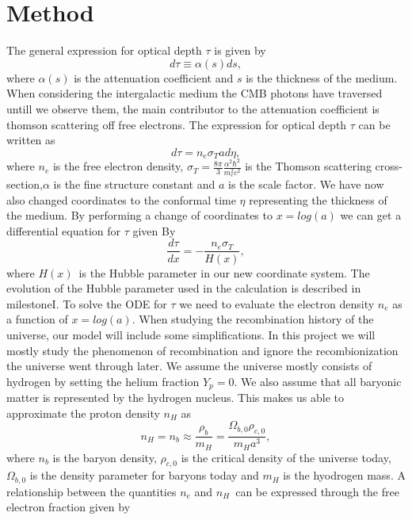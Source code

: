 \documentclass[onecolumn]{aastex62}
\begin{document}
\section{Method} \label{sec:method}
The general expression for optical depth $\tau$ is given by
\begin{equation}
    d\tau\equiv\alpha(s)ds,
\end{equation}
where $\alpha(s)$ is the attenuation coefficient and $s$ is the thickness of the medium. When considering the intergalactic medium the CMB photons have traversed untill we observe them, the main contributor to the attenuation coefficient is thomson scattering off free electrons. The expression for optical depth $\tau$ can be written as
\begin{equation}
    d\tau=n_e\sigma_T ad\eta,
\end{equation}
where $n_e$ is the free electron density, $\sigma_T = \frac{8\pi}{3}\frac{\alpha^2\hbar^2}{m_e^2c^2}$ is the Thomson scattering cross-section,$\alpha$ is the fine structure constant and $a$ is the scale factor. We have now also changed coordinates to the conformal time $\eta$ representing the thickness of the medium. By performing a change of coordinates to $x=log(a)$ we can get a differential equation for $\tau$ given By
\begin{equation}\label{eq:optical_depth_of_x}
    \frac{d\tau}{dx} = -\frac{n_e \sigma_T }{H(x)},
\end{equation}
where $H(x)$ is the Hubble parameter in our new coordinate system. The evolution of the Hubble parameter used in the calculation is described in milestoneI. To solve the ODE for $\tau$ we need to evaluate the electron density $n_e$ as a function of $x=log(a)$. When studying the recombination history of the universe, our model will include some simplifications. In this project we will mostly study the phenomenon of recombination and ignore the recombionization the universe went through later. We assume the universe mostly consists of hydrogen by setting the helium fraction $Y_p=0$. We also assume that all baryonic matter is represented by the hydrogen nucleus. This makes us able to approximate the proton density $n_H$ as
\begin{equation}\label{eq:baryondensity}
    n_H = n_b \approx \frac{\rho_b}{m_H} = \frac{\Omega_{b,0} \rho_{c,0}}{m_H a^3},
\end{equation}
where $n_b$ is the baryon density, $\rho_{c,0}$ is the critical density of the universe today, $\Omega_{b,0}$ is the density parameter for baryons today and $m_H$ is the hyodrogen mass. A relationship between the quantities $n_e$ and $n_H$ can be expressed through the free electron fraction given by
\end{document}
